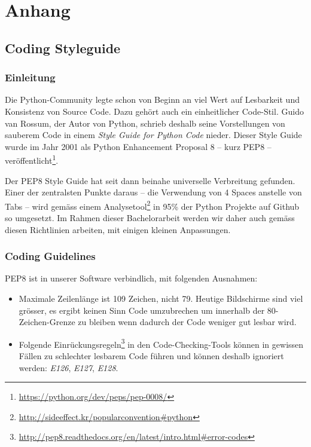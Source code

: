 \chapter{Anhang}

\section{Coding Styleguide}

\subsection{Einleitung}

Die Python-Community legte schon von Beginn an viel Wert auf Lesbarkeit und
Konsistenz von Source Code. Dazu gehört auch ein einheitlicher Code-Stil.  Guido
van Rossum, der Autor von Python, schrieb deshalb seine Vorstellungen von
sauberem Code in einem \textit{Style Guide for Python Code} nieder. Dieser Style
Guide wurde im Jahr 2001 als Python Enhancement Proposal 8 -- kurz PEP8 --
veröffentlicht\footnote{\url{https://python.org/dev/peps/pep-0008/}}.

Der PEP8 Style Guide hat seit dann beinahe universelle Verbreitung gefunden.
Einer der zentralsten Punkte daraus -- die Verwendung von 4 Spaces anstelle von
Tabs -- wird gemäss einem
Analysetool\footnote{\url{http://sideeffect.kr/popularconvention\#python}} in
95\% der Python Projekte auf Github so umgesetzt. Im Rahmen dieser Bachelorarbeit
werden wir daher auch gemäss diesen Richtlinien arbeiten, mit einigen kleinen
Anpassungen.

\subsection{Coding Guidelines}

PEP8 ist in unserer Software verbindlich, mit folgenden Ausnahmen:

\begin{itemize}
	\item Maximale Zeilenlänge ist 109 Zeichen, nicht 79. Heutige Bildschirme sind
		viel grösser, es ergibt keinen Sinn Code umzubrechen um innerhalb der
		80-Zeichen-Grenze zu bleiben wenn dadurch der Code weniger gut lesbar wird.
	\item Folgende
		Einrückungsregeln\footnote{\url{http://pep8.readthedocs.org/en/latest/intro.html\#error-codes}}
		in den Code-Checking-Tools können in gewissen Fällen zu schlechter lesbarem
		Code führen und können deshalb ignoriert werden: \textit{E126},
		\textit{E127}, \textit{E128}.
\end{itemize}


